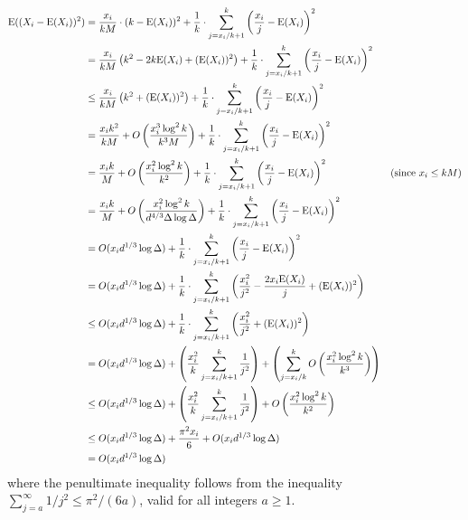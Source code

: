 \documentclass{patmorin}
\begin{document}
\begin{align*}
  \mathrm{E}((X_i-\mathrm{E}(X_i))^2)
  & = \frac{x_i}{kM}\cdot(k-\mathrm{E}(X_i))^2
    + \frac{1}{k}\cdot\sum_{j=x_i/k+1}^k \left(\frac{x_i}{j}-\mathrm{E}(X_i)\right)^2 \\
  & = \frac{x_i}{kM}\left(k^2-2k\mathrm{E}(X_i)+(\mathrm{E}(X_i))^2\right)
    + \frac{1}{k}\cdot \sum_{j=x_i/k+1}^k \left(\frac{x_i}{j}-\mathrm{E}(X_i)\right)^2 \\
  & \le \frac{x_i}{kM}\left(k^2 + (\mathrm{E}(X_i))^2\right)
    + \frac{1}{k}\cdot \sum_{j=x_i/k+1}^k \left(\frac{x_i}{j}-\mathrm{E}(X_i)\right)^2 \\
  & = \frac{x_i k^2}{kM} + O\left(\frac{x_i^3\log^2 k}{k^3M}\right)
      + \frac{1}{k}\cdot\sum_{j=x_i/k+1}^k \left(\frac{x_i}{j}-\mathrm{E}(X_i)\right)^2 \\
  & = \frac{x_i k}{M} + O\left(\frac{x_i^2\log^2 k}{k^2}\right)
      + \frac{1}{k}\cdot\sum_{j=x_i/k+1}^k \left(\frac{x_i}{j}-\mathrm{E}(X_i)\right)^2
      & \text{(since $x_i\le kM$)} \\
  & = \frac{x_i k}{M} + O\left(\frac{x_i^2\log^2 k}{d^{4/3}\Delta\log\Delta}\right)
      + \frac{1}{k}\cdot\sum_{j=x_i/k+1}^k \left(\frac{x_i}{j}-\mathrm{E}(X_i)\right)^2 \\
  & = O(x_id^{1/3}\log\Delta) + \frac{1}{k}\cdot\sum_{j=x_i/k+1}^k \left(\frac{x_i}{j}-\mathrm{E}(X_i)\right)^2 \\
 & = O(x_id^{1/3}\log\Delta) + \frac{1}{k}\cdot\sum_{j=x_i/k+1}^k \left(\frac{x_i^2}{j^2}-\frac{2x_i \mathrm{E}(X_i)}{j} + (\mathrm{E}(X_i))^2\right) \\
 & \le O(x_id^{1/3}\log\Delta) + \frac{1}{k}\cdot\sum_{j=x_i/k+1}^k \left(\frac{x_i^2}{j^2} + (\mathrm{E}(X_i))^2\right) \\
 & = O(x_id^{1/3}\log\Delta) +  \left(\frac{x_i^2}{k}\sum_{j=x_i/k+1}^k\frac{1}{j^2}\right)
   + \left(\sum_{j=x_i/k}^k O\left(\frac{x_i^2\log^2 k}{k^3}\right)\right) \\
 & \le O(x_id^{1/3}\log\Delta) + \left(\frac{x_i^2}{k}\sum_{j=x_i/k+1}^k\frac{1}{j^2}\right)
    + O\left(\frac{x_i^2\log^2 k}{k^2}\right)\\
  & \le O(x_id^{1/3}\log\Delta) + \frac{\pi^2 x_i}{6} + O(x_id^{1/3}\log\Delta) \\
  & = O(x_id^{1/3}\log\Delta)
\end{align*}
where the penultimate inequality follows from the inequality $\sum_{j=a}^{\infty} 1/j^2 \le \pi^2/(6a)$, valid for all integers $a\ge 1$.
\end{document}
